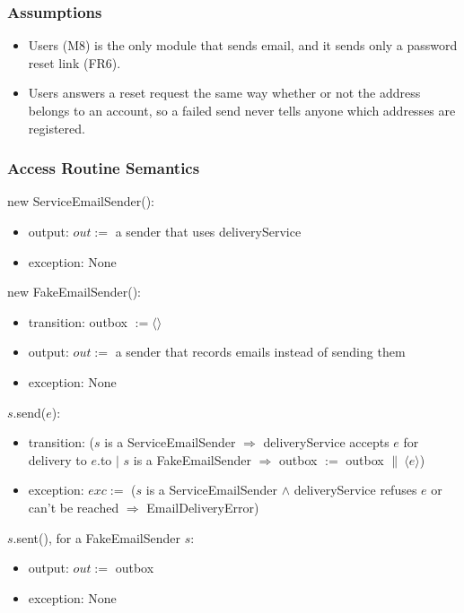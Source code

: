 \documentclass[12pt, titlepage]{article}
\begin{document}
\subsubsection{Assumptions}

\begin{itemize}
\item Users (M8) is the only module that sends email, and it sends only a
  password reset link (FR6).
\item Users answers a reset request the same way whether or not the address
  belongs to an account, so a failed send never tells anyone which addresses
  are registered.
\end{itemize}

\subsubsection{Access Routine Semantics}

\noindent new ServiceEmailSender():
\begin{itemize}
\item output: $out :=$ a sender that uses deliveryService
\item exception: None
\end{itemize}

\noindent new FakeEmailSender():
\begin{itemize}
\item transition: outbox $:= \langle\rangle$
\item output: $out :=$ a sender that records emails instead of sending them
\item exception: None
\end{itemize}

\noindent $s$.send($e$):
\begin{itemize}
\item transition: ($s$ is a ServiceEmailSender $\Rightarrow$ deliveryService
  accepts $e$ for delivery to $e$.to $|$ $s$ is a FakeEmailSender
  $\Rightarrow$ outbox $:=$ outbox $\|\ \langle e \rangle$)
\item exception: $exc :=$ ($s$ is a ServiceEmailSender $\wedge$
  deliveryService refuses $e$ or can't be reached $\Rightarrow$
  EmailDeliveryError)
\end{itemize}

\noindent $s$.sent(), for a FakeEmailSender $s$:
\begin{itemize}
\item output: $out :=$ outbox
\item exception: None
\end{itemize}
\end{document}
